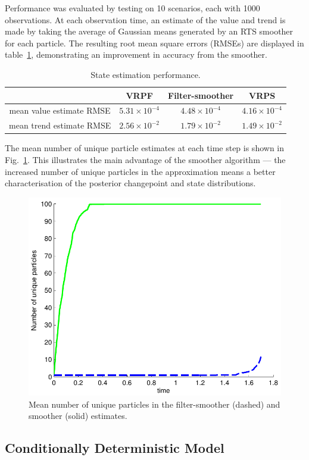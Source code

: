 \documentclass[peerreview,11pt,draftcls,onecolumn]{IEEEtran}
\begin{document}
Performance was evaluated by testing on 10 scenarios, each with 1000 observations. At each observation time, an estimate of the value and trend is made by taking the average of Gaussian means generated by an RTS smoother for each particle. The resulting root mean square errors (RMSEs) are displayed in table~\ref{tab:finance_state_performance}, demonstrating an improvement in accuracy from the smoother.

\begin{table}%
\caption{State estimation performance.}
\label{tab:finance_state_performance}
\centering
\begin{tabular}{|c|c|c|c|}
\hline
 & VRPF & Filter-smoother & VRPS \\
\hline \hline
\centering mean value estimate RMSE & $5.31 \times 10^{-4}$ & $4.48 \times 10^{-4}$ & $4.16 \times 10^{-4}$ \\
\hline
\centering mean trend estimate RMSE & $2.56 \times 10^{-2}$ & $1.79 \times 10^{-2}$ & $1.49 \times 10^{-2}$ \\
\hline
\end{tabular}
\end{table}

The mean number of unique particle estimates at each time step is shown in Fig.~\ref{fig:finance_unique_particles}. This illustrates the main advantage of the smoother algorithm --- the increased number of unique particles in the approximation means a better characterisation of the posterior changepoint and state distributions.

\begin{figure}[!t]
\centering
\includegraphics[width=0.45\columnwidth]{finance_unique_particles.pdf}
\caption{Mean number of unique particles in the filter-smoother (dashed) and smoother (solid) estimates.}
\label{fig:finance_unique_particles}
\end{figure}



\subsection{Conditionally Deterministic Model}
\end{document}
